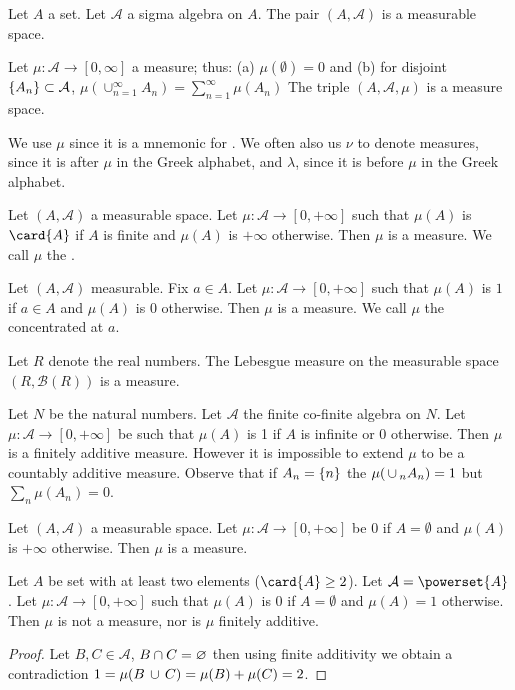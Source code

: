 
Let $A$ a set.
Let $\mathcal{A}$ a sigma algebra on $A$.
The pair $(A, \mathcal{A})$ is a measurable space.

Let $\mu: \mathcal{A} \to [0, \infty]$ a measure;
thus:
(a) $\mu(\emptyset) = 0$ and
(b) for disjoint $\{A_n\} \subset \mathcal{A}$,
$\mu(\cup_{n = 1}^{\infty} A_n)
  = \sum_{n = 1}^{\infty} \mu(A_n)$
The triple $(A, \mathcal{A}, \mu)$ is a
measure space.

We use $\mu$ since it
is a mnemonic for .
We often also us
$\nu$ to denote measures,
since it is after
$\mu$ in the Greek alphabet,
and $\lambda$, since
it is before
$\mu$ in the Greek alphabet.


\begin{expl}
Let $(A, \mathcal{A})$ a measurable space.
Let $\mu: \mathcal{A} \to [0, +\infty]$ such that
$\mu(A)$ is $\card{A}$ if $A$ is finite
and $\mu(A)$ is $+\infty$ otherwise.
Then $\mu$ is a measure.
We call $\mu$ the
.
\end{expl}

\begin{expl}
Let $(A, \mathcal{A})$ measurable.
Fix $a \in A$.
Let $\mu: \mathcal{A} \to [0, +\infty]$ such
that $\mu(A)$ is $1$ if $a \in A$ and
$\mu(A)$ is $0$ otherwise.
Then $\mu$ is a measure.
We call $\mu$ the
concentrated at $a$.
\end{expl}

\begin{expl}
Let $R$ denote the real numbers.
The Lebesgue measure on the measurable
space $(R, \mathcal{B}(R))$ is a measure.
\end{expl}

\begin{expl}
Let $N$ be the natural numbers.
Let $\mathcal{A}$ the finite
co-finite algebra on $N$.
Let $\mu: \mathcal{A} \to [0, +\infty]$
be such that $\mu(A)$ is 1 if
$A$ is infinite or 0 otherwise.
Then $\mu$ is a finitely additive measure.
However it is impossible to extend
$\mu$ to be a countably additive measure.
Observe that if $A_n = \{n\}$ the
$\mu(\,\cup\,_{n} A_n) = 1$ but
$\sum_{n} \mu(A_n) = 0$.
\end{expl}

\begin{expl}
Let $(A, \mathcal{A})$ a measurable
space.
Let $\mu: \mathcal{A} \to [0, +\infty]$
be $0$ if $A = \emptyset$ and
$\mu(A)$ is $+\infty$ otherwise.
Then $\mu$ is a measure.
\end{expl}

\begin{expl}
Let $A$ be set with at least
two elements ($\card{A} \geq 2$).
Let $\mathcal{A} = \powerset{A}$.
Let $\mu: \mathcal{A} \to [0, +\infty]$
such that $\mu(A)$ is $0$ if $A = \emptyset$
and $\mu(A) = 1$ otherwise.
Then $\mu$ is not a measure,
nor is $\mu$ finitely additive.
\begin{proof}
Let $B, C \in \mathcal{A}$,
$B \cap C = \varnothing$
then using finite additivity
we obtain a contradiction
$
1 = \mu(B \,\cup\, C) = \mu(B) + \mu(C) = 2
$.
\end{proof}
\end{expl}
\strats
